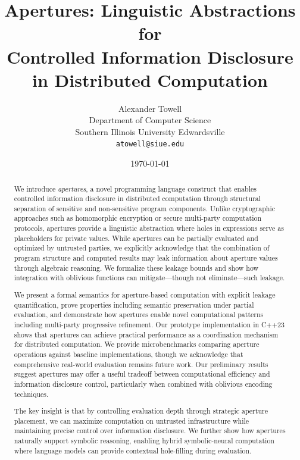 \documentclass[12pt]{article}
\begin{document}
\title{\Large \bf Apertures: Linguistic Abstractions for\\Controlled Information Disclosure in Distributed Computation}

\author{
Alexander Towell\\
Department of Computer Science\\
Southern Illinois University Edwardsville\\
\texttt{atowell@siue.edu}
}

\date{\today}

\maketitle

\begin{abstract}
We introduce \textit{apertures}, a novel programming language construct that enables controlled information disclosure in distributed computation through structural separation of sensitive and non-sensitive program components. Unlike cryptographic approaches such as homomorphic encryption or secure multi-party computation protocols, apertures provide a linguistic abstraction where holes in expressions serve as placeholders for private values. While apertures can be partially evaluated and optimized by untrusted parties, we explicitly acknowledge that the combination of program structure and computed results may leak information about aperture values through algebraic reasoning. We formalize these leakage bounds and show how integration with oblivious functions can mitigate—though not eliminate—such leakage. 

We present a formal semantics for aperture-based computation with explicit leakage quantification, prove properties including semantic preservation under partial evaluation, and demonstrate how apertures enable novel computational patterns including multi-party progressive refinement. Our prototype implementation in C++23 shows that apertures can achieve practical performance as a coordination mechanism for distributed computation. We provide microbenchmarks comparing aperture operations against baseline implementations, though we acknowledge that comprehensive real-world evaluation remains future work. Our preliminary results suggest apertures may offer a useful tradeoff between computational efficiency and information disclosure control, particularly when combined with oblivious encoding techniques.

The key insight is that by controlling evaluation depth through strategic aperture placement, we can maximize computation on untrusted infrastructure while maintaining precise control over information disclosure. We further show how apertures naturally support symbolic reasoning, enabling hybrid symbolic-neural computation where language models can provide contextual hole-filling during evaluation.
\end{abstract}
\end{document}
